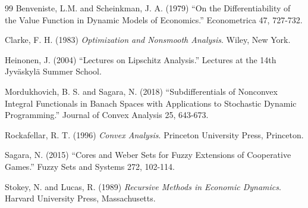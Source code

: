 \documentclass[a4paper,12pt]{article}
\theoremstyle{definition}
\begin{document}
\begin{thebibliography}{99}
 Benveniste, L.M. and Scheinkman, J. A. (1979) ``On the Differentiability of the Value Function in Dynamic Models of Economics.'' Econometrica 47, 727-732.

 Clarke, F. H. (1983) {\it Optimization and Nonsmooth Analysis}. Wiley, New York.

 Heinonen, J. (2004) ``Lectures on Lipschitz Analysis.'' Lectures at the 14th Jyv\"askyl\"a Summer School.

 Mordukhovich, B. S. and Sagara, N. (2018) ``Subdifferentials of Nonconvex Integral Functionals in Banach Spaces with Applications to Stochastic Dynamic Programming.'' Journal of Convex Analysis 25, 643-673.

 Rockafellar, R. T. (1996) {\it Convex Analysis}. Princeton University Press, Princeton.

 Sagara, N. (2015) ``Cores and Weber Sets for Fuzzy Extensions of Cooperative Games.'' Fuzzy Sets and Systems 272, 102-114.

 Stokey, N. and Lucas, R. (1989) {\it Recursive Methods in Economic Dynamics}. Harvard University Press, Massachusetts.


\end{thebibliography}
\end{document}

